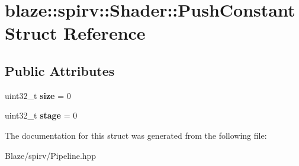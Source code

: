 \hypertarget{structblaze_1_1spirv_1_1Shader_1_1PushConstant}{}\section{blaze\+:\+:spirv\+:\+:Shader\+:\+:Push\+Constant Struct Reference}
\label{structblaze_1_1spirv_1_1Shader_1_1PushConstant}
\subsection*{Public Attributes}
\begin{DoxyCompactItemize}
\item 
\mbox{\label{structblaze_1_1spirv_1_1Shader_1_1PushConstant_a402407530e6343b10f4f044907b16ce6}} 
uint32\+\_\+t {\bfseries size} = 0
\item 
\mbox{\label{structblaze_1_1spirv_1_1Shader_1_1PushConstant_a365b9dcfad25720275ca8841f77de389}} 
uint32\+\_\+t {\bfseries stage} = 0
\end{DoxyCompactItemize}


The documentation for this struct was generated from the following file\+:\begin{DoxyCompactItemize}
\item 
Blaze/spirv/Pipeline.\+hpp\end{DoxyCompactItemize}
